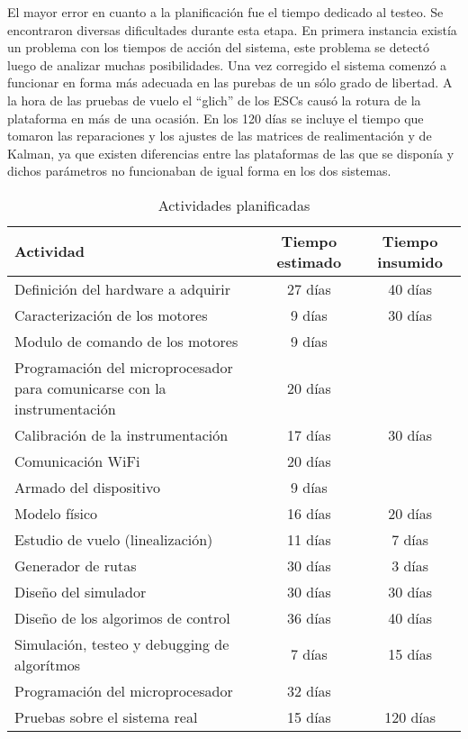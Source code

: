 \documentclass[main]{subfiles}
\begin{document}
El mayor error en cuanto a la planificaci\'on fue el tiempo dedicado al testeo. Se encontraron diversas dificultades durante esta etapa. En primera instancia exist\'ia un problema con los tiempos de acci\'on del sistema, este problema se detect\'o luego de analizar muchas posibilidades. Una vez corregido el sistema comenz\'o a funcionar en forma m\'as adecuada en las purebas de un s\'olo grado de libertad. A la hora de las pruebas de vuelo el ``glich'' de los ESCs caus\'o la rotura de la plataforma en m\'as de una ocasi\'on. En los 120 d\'ias se incluye el tiempo que tomaron las reparaciones y los ajustes de las matrices de realimentaci\'on y de Kalman, ya que existen diferencias entre las plataformas de las que se dispon\'ia y dichos par\'ametros no funcionaban de igual forma en los dos sistemas.\\ 

\begin{table}
\begin{tabular}{|p{150pt}|c|c|}
\hline
\cellcolor[gray]{0.8} Actividad & \cellcolor[gray]{0.8} Tiempo estimado & \cellcolor[gray]{0.8} Tiempo insumido\\
\hline
Definici\'on del hardware a adquirir & 27 d\'ias & 40 d\'ias\\
\hline
Caracterizaci\'on de los motores & 9 d\'ias & 30 d\'ias\\
\hline
Modulo de comando de los motores & 9 d\'ias &  \\
\hline
Programaci\'on del microprocesador para comunicarse con la instrumentaci\'on & 20 d\'ias & \\
\hline
Calibraci\'on de la instrumentaci\'on &17 d\'ias & 30 d\'ias \\
\hline
Comunicaci\'on WiFi &20 d\'ias & \\
\hline
Armado del dispositivo & 9 d\'ias & \\
\hline
Modelo f\'isico & 16 d\'ias & 20 d\'ias \\
\hline
Estudio de vuelo (linealizaci\'on) & 11 d\'ias & 7 d\'ias \\
\hline
Generador de rutas & 30 d\'ias& 3 d\'ias \\
\hline
Diseño del simulador &30 d\'ias & 30 d\'ias \\
\hline
Diseño de los algorimos de control & 36 d\'ias & 40 d\'ias \\
\hline
Simulaci\'on, testeo y debugging de algor\'itmos & 7 d\'ias & 15 d\'ias \\
\hline
Programaci\'on del microprocesador & 32 d\'ias & \\ 
\hline
Pruebas sobre el sistema real & 15 d\'ias & 120 d\'ias \\
\hline
\end{tabular}

\caption{Actividades planificadas}
\label{tab:wbs}
\end{table} 
\end{document}
